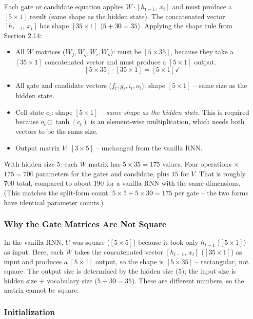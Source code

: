 Each gate or candidate equation applies $W \cdot [h_{t-1},\, x_t]$ and must produce
a $[5 \times 1]$ result (same shape as the hidden state). The concatenated vector
$[h_{t-1},\, x_t]$ has shape $[35 \times 1]$ ($5 + 30 = 35$). Applying the shape
rule from Section 2.14:

\begin{itemize}
    \item All $W$ matrices ($W_f, W_g, W_i, W_o$): must be $[5 \times 35]$, because
    they take a $[35 \times 1]$ concatenated vector and must produce a $[5 \times 1]$
    output.
    \[
    [5 \times 35] \cdot [35 \times 1] = [5 \times 1] \checkmark
    \]
    \item All gate and candidate vectors ($f_t, g_t, i_t, o_t$): shape $[5 \times 1]$
    -- same size as the hidden state.
    \item Cell state $c_t$: shape $[5 \times 1]$ -- \textit{same shape as the hidden
    state}. This is required because $o_t \odot \tanh(c_t)$ is an element-wise
    multiplication, which needs both vectors to be the same size.
    \item Output matrix $V$: $[3 \times 5]$ -- unchanged from the vanilla RNN.
\end{itemize}

With hidden size 5: each $W$ matrix has $5 \times 35 = 175$ values. Four operations
$\times$ $175 = 700$ parameters for the gates and candidate, plus $15$ for $V$. That
is roughly $700$ total, compared to about $190$ for a vanilla RNN with the same
dimensions. (This matches the split-form count: $5{\times}5 + 5{\times}30 = 175$ per
gate -- the two forms have identical parameter counts.)

\subsubsection{Why the Gate Matrices Are Not Square}

In the vanilla RNN, $U$ was square ($[5 \times 5]$) because it took only $h_{t-1}$
($[5 \times 1]$) as input. Here, each $W$ takes the concatenated vector
$[h_{t-1},\, x_t]$ ($[35 \times 1]$) as input and produces a $[5 \times 1]$ output,
so the shape is $[5 \times 35]$ -- rectangular, not square. The output size is
determined by the hidden size (5); the input size is hidden size + vocabulary size
($5 + 30 = 35$). These are different numbers, so the matrix cannot be square.

\subsubsection{Initialization}

